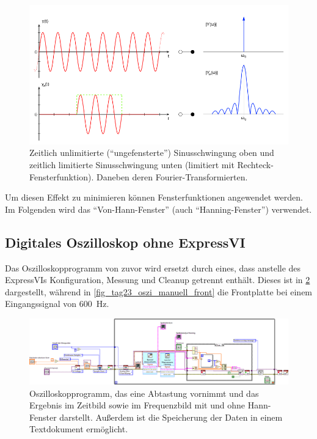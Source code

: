 \documentclass[
a4paper,
12pt,
pagesize,
ngerman
]{scrartcl}
\begin{document}
	\begin{figure}[H]  
		\includegraphics[width=1\textwidth]{EIRE2018Dateien/sonstige_Dateien/leakage}
		\centering
		\caption{
			Zeitlich unlimitierte (\enquote{ungefensterte}) Sinusschwingung oben und zeitlich limitierte Sinusschwingung unten (limitiert mit Rechteck-Fensterfunktion). Daneben deren Fourier-Transformierten. \cite{Leakage} %
		}
		\label{fig_leakage_veranschaulichung}
		\centering
	\end{figure}

	Um diesen Effekt zu minimieren können Fensterfunktionen angewendet werden.
	Im Folgenden wird das \enquote{Von-Hann-Fenster} (auch \enquote{Hanning-Fenster}) verwendet. %
	
	\subsection{Digitales Oszilloskop ohne ExpressVI} %
	Das Oszilloskopprogramm von zuvor wird ersetzt durch eines, dass anstelle des ExpressVIs Konfiguration, Messung und Cleanup getrennt enthält.
	Dieses ist in \cref{fig_tag23_oszi_manuell_block} dargestellt, während in \cref{fig_tag23_oszi_manuell_front} die Frontplatte bei einem Eingangssignal von \SI{600}{\hertz}.
	
	\begin{figure}[H]  
		\includegraphics[width=1\textwidth]{EIRE2018Dateien/Tag3/ManuellVId}
		\centering
		\caption{
			Oszilloskopprogramm, das eine Abtastung vornimmt und das Ergebnis im Zeitbild sowie im Frequenzbild mit und ohne Hann-Fenster darstellt.
			Außerdem ist die Speicherung der Daten in einem Textdokument ermöglicht.
		}
		\label{fig_tag23_oszi_manuell_block}
		\centering
	\end{figure}
\end{document}
